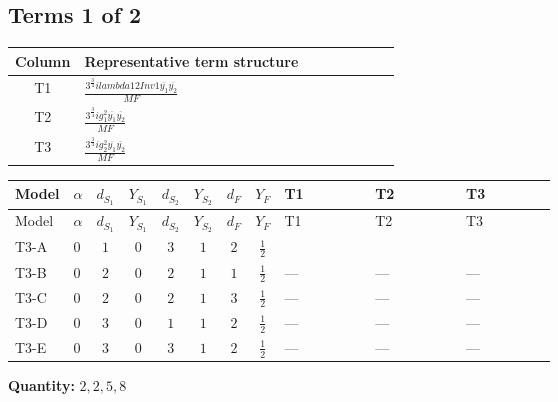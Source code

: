 \documentclass[8pt]{article}
\begin{document}
\begin{landscape}
\subsection*{Terms 1 of 2}
\begin{center}
\begin{tabular}{@{}c >{\raggedright\arraybackslash}p{0.82\linewidth}@{}}
\toprule
Column & Representative term structure \\
\midrule
T1 & \(\displaystyle \frac{3^{\frac{3}{4}} i lambda12Inv1 \overline{y_{1}} \overline{y_{2}}}{MF}\) \\
\midrule
T2 & \(\displaystyle \frac{3^{\frac{3}{4}} i g_{1}^{2} \overline{y_{1}} \overline{y_{2}}}{MF}\) \\
\midrule
T3 & \(\displaystyle \frac{3^{\frac{3}{4}} i g_{2}^{2} \overline{y_{1}} \overline{y_{2}}}{MF}\) \\
\midrule
\bottomrule
\end{tabular}
\end{center}
\smallskip
\tiny
\begin{longtable}{@{}llcccccc >{\raggedright\arraybackslash}p{0.21\linewidth} >{\raggedright\arraybackslash}p{0.21\linewidth} >{\raggedright\arraybackslash}p{0.21\linewidth}@{}}
\toprule
Model & $\alpha$ & $d_{S_1}$ & $Y_{S_1}$ & $d_{S_2}$ & $Y_{S_2}$ & $d_F$ & $Y_F$ & T1 & T2 & T3 \\
\midrule
\endfirsthead
\toprule
Model & $\alpha$ & $d_{S_1}$ & $Y_{S_1}$ & $d_{S_2}$ & $Y_{S_2}$ & $d_F$ & $Y_F$ & T1 & T2 & T3 \\
\midrule
\endhead
T3-A & $0$ & $1$ & $0$ & $3$ & $1$ & $2$ & $\frac{1}{2}$ & \scriptsize\adjustbox{max width=\linewidth}{$\begin{gathered} \frac{3^{\frac{3}{4}} i lambda12Inv1 \overline{y_{1}} \overline{y_{2}}}{6 MF}\end{gathered}$} & \scriptsize\adjustbox{max width=\linewidth}{$\begin{gathered} \frac{3^{\frac{3}{4}} i g_{1}^{2} \overline{y_{1}} \overline{y_{2}}}{8 MF}\end{gathered}$} & \scriptsize\adjustbox{max width=\linewidth}{$\begin{gathered} \frac{17 \cdot 3^{\frac{3}{4}} i g_{2}^{2} \overline{y_{1}} \overline{y_{2}}}{24 MF}\end{gathered}$} \\
\midrule
T3-B & $0$ & $2$ & $0$ & $2$ & $1$ & $1$ & $\frac{1}{2}$ & --- & --- & --- \\
\midrule
T3-C & $0$ & $2$ & $0$ & $2$ & $1$ & $3$ & $\frac{1}{2}$ & --- & --- & --- \\
\midrule
T3-D & $0$ & $3$ & $0$ & $1$ & $1$ & $2$ & $\frac{1}{2}$ & --- & --- & --- \\
\midrule
T3-E & $0$ & $3$ & $0$ & $3$ & $1$ & $2$ & $\frac{1}{2}$ & --- & --- & --- \\
\midrule
\bottomrule
\end{longtable}
\clearpage
\noindent\textbf{Quantity: }$\mathrm{2,2,5,8}$\par\smallskip

\end{landscape}
\end{document}
